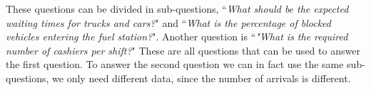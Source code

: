 These questions can be divided in sub-questions, ``\textit{What should be the expected waiting times for trucks and cars?}" and ``\textit{What is the percentage of blocked vehicles entering the fuel station?}".
Another question is ``\textit{"What is the required number of cashiers per shift?}"
These are all questions that can be used to answer the first question.
To answer the second question we can in fact use the same sub-questions, we only need different data, since the number of arrivals is different.
